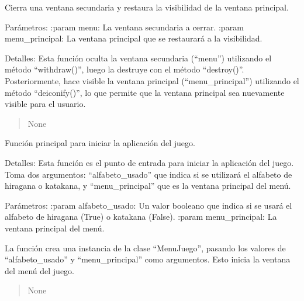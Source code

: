 \documentclass[letterpaper,10pt,spanish]{sphinxmanual}
\begin{document}
\begin{fulllineitems}
\label{\detokenize{menu_juego:menu_juego.cerrar_ventana}}
\pysigstartsignatures
{}
\pysigstopsignatures
\sphinxAtStartPar
Cierra una ventana secundaria y restaura la visibilidad de la ventana principal.

\sphinxAtStartPar
Parámetros:
:param menu: La ventana secundaria a cerrar.
:param menu\_principal: La ventana principal que se restaurará a la visibilidad.

\sphinxAtStartPar
Detalles:
Esta función oculta la ventana secundaria (“menu”) utilizando el método “withdraw()”, luego la destruye con el
método “destroy()”. Posteriormente, hace visible la ventana principal (“menu\_principal”) utilizando el método
“deiconify()”, lo que permite que la ventana principal sea nuevamente visible para el usuario.
\begin{quote}\begin{description}
\sphinxAtStartPar
None

\end{description}\end{quote}

\end{fulllineitems}


\begin{fulllineitems}
\label{\detokenize{menu_juego:menu_juego.main}}
\pysigstartsignatures
{}
\pysigstopsignatures
\sphinxAtStartPar
Función principal para iniciar la aplicación del juego.

\sphinxAtStartPar
Detalles:
Esta función es el punto de entrada para iniciar la aplicación del juego. Toma dos argumentos: “alfabeto\_usado”
que indica si se utilizará el alfabeto de hiragana o katakana, y “menu\_principal” que es la ventana principal
del menú.

\sphinxAtStartPar
Parámetros:
:param alfabeto\_usado: Un valor booleano que indica si se usará el alfabeto de hiragana (True) o katakana (False).
:param menu\_principal: La ventana principal del menú.

\sphinxAtStartPar
La función crea una instancia de la clase “MenuJuego”, pasando los valores de “alfabeto\_usado” y “menu\_principal”
como argumentos. Esto inicia la ventana del menú del juego.
\begin{quote}\begin{description}
\sphinxAtStartPar
None

\end{description}\end{quote}

\end{fulllineitems}
\end{document}
